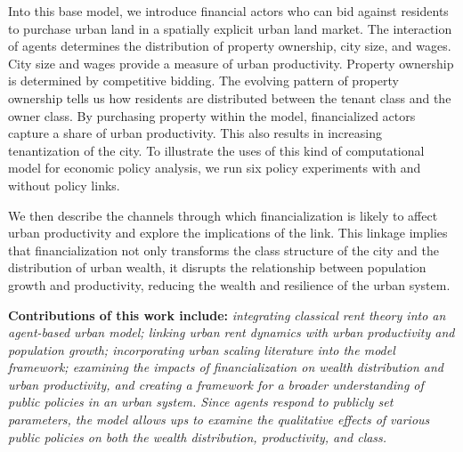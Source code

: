Into this base model, we introduce financial actors who can bid against residents to purchase urban land in a spatially explicit urban land market. %
The interaction of agents determines the distribution of property ownership,  city size, and wages. City size and wages provide a measure of urban productivity. Property ownership is determined by competitive bidding. The evolving pattern of property ownership tells us how residents are distributed between the tenant class and the owner class. %
By purchasing property within the model, financialized actors capture a share of urban productivity. %
This also results in increasing tenantization of the city. 
To illustrate the uses of this kind of computational model for economic policy analysis, we run six policy experiments with and without policy links. 


We then describe the channels through which financialization is likely to affect urban productivity and explore the implications of the link. %
This linkage implies that financialization not only transforms the class structure of the city and the distribution of urban wealth, it disrupts the relationship between population growth and productivity, reducing the wealth and resilience of the urban system. 

\textbf{Contributions of this work include:} \textit{integrating classical rent theory into an agent-based urban model; linking urban rent dynamics with urban productivity and population growth; incorporating urban scaling literature into the model framework; examining the impacts of financialization on wealth distribution and urban productivity, and creating a framework for a broader understanding of public policies in an urban system. Since agents respond to publicly set parameters, the model allows ups to examine the qualitative effects of  various public policies on both the wealth distribution, productivity, and class.}


